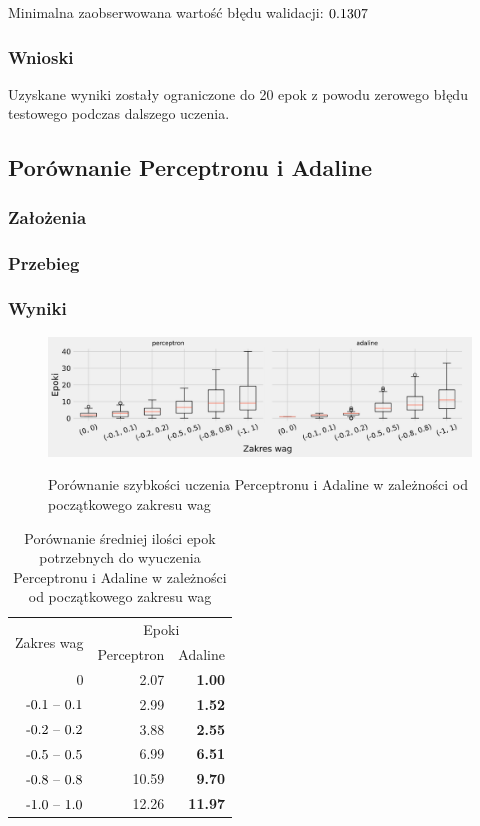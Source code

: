 \documentclass{article}
\begin{document}
Minimalna zaobserwowana wartość błędu walidacji: \($0.1307$\)

\subsubsection*{Wnioski}

Uzyskane wyniki zostały ograniczone do 20 epok z powodu zerowego błędu testowego podczas dalszego uczenia.

\newpage
\subsection{Porównanie Perceptronu i Adaline}
\subsubsection*{Założenia}
\subsubsection*{Przebieg}
\subsubsection*{Wyniki}

\begin{figure}[h]
	\centering
	\caption{Porównanie szybkości uczenia Perceptronu i Adaline w zależności od początkowego zakresu wag}
	\includegraphics[width=\textwidth]{ada_per_w.png}
	\label{fig:res81}
\end{figure}

\begin{table}[h]
	\caption{Porównanie średniej ilości epok potrzebnych do wyuczenia Perceptronu i Adaline w zależności od początkowego zakresu wag}
	\label{tabela-res-81}
	\centering
	\begin{tabular}{rrr}
		\toprule
		\multirow{2}{*}{Zakres wag}   & \multicolumn{2}{c}{Epoki} \\
		                  & Perceptron & Adaline        \\
		\midrule
		0                 & 2.07       & \textbf{1.00}  \\
		\($-0.1 -- 0.1$\) & 2.99       & \textbf{1.52}  \\
		\($-0.2 -- 0.2$\) & 3.88       & \textbf{2.55}  \\
		\($-0.5 -- 0.5$\) & 6.99       & \textbf{6.51}  \\
		\($-0.8 -- 0.8$\) & 10.59      & \textbf{9.70}  \\
		\($-1.0 -- 1.0$\) & 12.26      & \textbf{11.97} \\
		\bottomrule
	\end{tabular}
\end{table}
\end{document}

